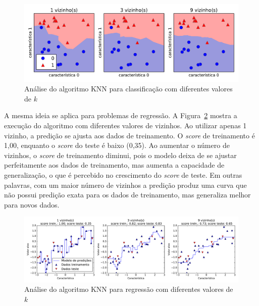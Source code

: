 \begin{figure}[h]
	\centering
	\includegraphics[width=\textwidth]{img/analise-knn}
	\caption{Análise do algoritmo KNN para classificação com diferentes valores de $k$}
	\label{fig:analise-knn}
\end{figure}

A mesma ideia se aplica para problemas de regressão. A Figura~\ref{fig:analise-knn-regressao} mostra a execução do algoritmo com diferentes valores de vizinhos. Ao utilizar apenas 1 vizinho, a predição se ajusta aos dados de treinamento. O \textit{score} de treinamento é 1,00, enquanto o \textit{score} do teste é baixo (0,35). Ao aumentar o número de vizinhos, o \textit{score} de treinamento diminui, pois o modelo deixa de se ajustar perfeitamente aos dados de treinamento, mas aumenta a capacidade de generalização, o que é percebido no crescimento do \textit{score} de teste. Em outras palavras, com um maior número de vizinhos a predição produz uma curva que não possui predição exata para os dados de treinamento, mas generaliza melhor para novos dados.

\begin{figure}[h]
	\centering
	\includegraphics[width=\textwidth]{img/analise-knn-regressao}
	\caption{Análise do algoritmo KNN para regressão com diferentes valores de $k$}
	\label{fig:analise-knn-regressao}
\end{figure}

